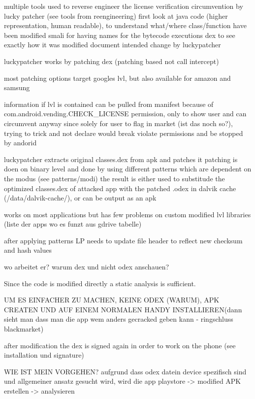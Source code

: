multiple tools used to reverse engineer the license verification circumvention by lucky patcher (see tools from reengineering)
first look at java code (higher representation, human readable), to understand what/where class/function have been modified
smali for having names for the bytecode executions
dex to see exactly how it was modified
document intended change by luckypatcher

luckypatcher works by patching dex (patching based not call intercept)

most patching options target googles lvl, but also available for amazon and samsung

information if lvl is contained can be pulled from manifest because of com.android.vending.CHECK\_LICENSE permission, only to show user and can circumvent anyway since solely for user to flag in market (ist das noch so?), trying to trick and not declare would break violate permissions and be stopped by andorid

luckypatcher extracts original classes.dex from apk and patches it
patching is doen on binary level and done by using different patterns which are dependent on the modus (see patterns/modi)
the result is either used to substitude the optimized classes.dex of attacked app with the patched .odex in dalvik cache (/data/dalvik-cache/), or can be output as an apk

works on most applications but has few problems on custom modified lvl libraries (liste der apps wo es funzt aus gdrive tabelle)

after applying patterns LP needs to update file header to reflect new checksum and hash values

\cite{munteanLicense}
%

wo arbeitet er?\newline
warum dex und nicht odex anschauen?\newline

Since the code is modified directly a static analysis is sufficient.\newline

UM ES EINFACHER ZU MACHEN, KEINE ODEX (WARUM), APK CREATEN UND AUF EINEM NORMALEN HANDY INSTALLIEREN(dann sieht man dass man die app wem anders gecracked geben kann - ringschluss blackmarket)\newline

after modification the dex is signed again in order to work on the phone (see installation und signature)

WIE IST MEIN VORGEHEN?
aufgrund dass odex datein device spezifisch sind und allgemeiner ansatz gesucht wird, wird die
app playstore -> modified APK erstellen -> analysieren
